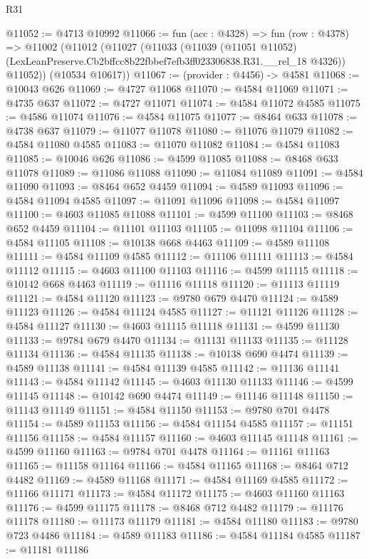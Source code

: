 \begin{lexlean}{R31}
\begin{coremodule}
@11052 := @4713 @10992
@11066 := fun (acc : @4328) =>
  fun (row : @4378) =>
  @11002
    (@11012
      (@11027
        (@11033
          (@11039
            (@11051 @11052)
            (LexLeanPreserve.Cb2bffcc8b22fbbef7efb3ff023306838.R31.__rel_18 @4326))
          @11052))
      (@10534 @10617))
@11067 := (provider : @4456) -> @4581
@11068 := @10043 @626
@11069 := @4727 @11068
@11070 := @4584 @11069
@11071 := @4735 @637
@11072 := @4727 @11071
@11074 := @4584 @11072 @4585
@11075 := @4586 @11074
@11076 := @4584 @11075
@11077 := @8464 @633
@11078 := @4738 @637
@11079 := @11077 @11078
@11080 := @11076 @11079
@11082 := @4584 @11080 @4585
@11083 := @11070 @11082
@11084 := @4584 @11083
@11085 := @10046 @626
@11086 := @4599 @11085
@11088 := @8468 @633 @11078
@11089 := @11086 @11088
@11090 := @11084 @11089
@11091 := @4584 @11090
@11093 := @8464 @652 @4459
@11094 := @4589 @11093
@11096 := @4584 @11094 @4585
@11097 := @11091 @11096
@11098 := @4584 @11097
@11100 := @4603 @11085 @11088
@11101 := @4599 @11100
@11103 := @8468 @652 @4459
@11104 := @11101 @11103
@11105 := @11098 @11104
@11106 := @4584 @11105
@11108 := @10138 @668 @4463
@11109 := @4589 @11108
@11111 := @4584 @11109 @4585
@11112 := @11106 @11111
@11113 := @4584 @11112
@11115 := @4603 @11100 @11103
@11116 := @4599 @11115
@11118 := @10142 @668 @4463
@11119 := @11116 @11118
@11120 := @11113 @11119
@11121 := @4584 @11120
@11123 := @9780 @679 @4470
@11124 := @4589 @11123
@11126 := @4584 @11124 @4585
@11127 := @11121 @11126
@11128 := @4584 @11127
@11130 := @4603 @11115 @11118
@11131 := @4599 @11130
@11133 := @9784 @679 @4470
@11134 := @11131 @11133
@11135 := @11128 @11134
@11136 := @4584 @11135
@11138 := @10138 @690 @4474
@11139 := @4589 @11138
@11141 := @4584 @11139 @4585
@11142 := @11136 @11141
@11143 := @4584 @11142
@11145 := @4603 @11130 @11133
@11146 := @4599 @11145
@11148 := @10142 @690 @4474
@11149 := @11146 @11148
@11150 := @11143 @11149
@11151 := @4584 @11150
@11153 := @9780 @701 @4478
@11154 := @4589 @11153
@11156 := @4584 @11154 @4585
@11157 := @11151 @11156
@11158 := @4584 @11157
@11160 := @4603 @11145 @11148
@11161 := @4599 @11160
@11163 := @9784 @701 @4478
@11164 := @11161 @11163
@11165 := @11158 @11164
@11166 := @4584 @11165
@11168 := @8464 @712 @4482
@11169 := @4589 @11168
@11171 := @4584 @11169 @4585
@11172 := @11166 @11171
@11173 := @4584 @11172
@11175 := @4603 @11160 @11163
@11176 := @4599 @11175
@11178 := @8468 @712 @4482
@11179 := @11176 @11178
@11180 := @11173 @11179
@11181 := @4584 @11180
@11183 := @9780 @723 @4486
@11184 := @4589 @11183
@11186 := @4584 @11184 @4585
@11187 := @11181 @11186

\end{coremodule}
\end{lexlean}
